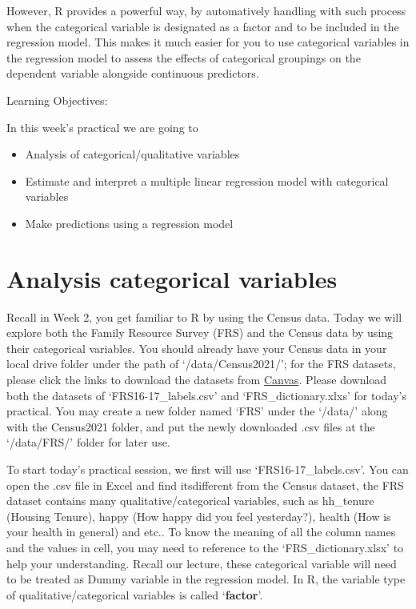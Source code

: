 \documentclass[
  letterpaper,
  DIV=11,
  numbers=noendperiod]{scrreprt}
\begin{document}
However, R provides a powerful way, by automatively handling with such
process when the categorical variable is designated as a factor and to
be included in the regression model. This makes it much easier for you
to use categorical variables in the regression model to assess the
effects of categorical groupings on the dependent variable alongside
continuous predictors.

Learning Objectives:

In this week's practical we are going to

\begin{itemize}
\item
  Analysis of categorical/qualitative variables
\item
  Estimate and interpret a multiple linear regression model with
  categorical variables
\item
  Make predictions using a regression model
\end{itemize}

\section{Analysis categorical
variables}\label{analysis-categorical-variables}

Recall in Week 2, you get familiar to R by using the Census data. Today
we will explore both the Family Resource Survey (FRS) and the Census
data by using their categorical variables. You should already have your
Census data in your local drive folder under the path of
`/data/Census2021/'; for the FRS datasets, please click the links to
download the datasets from
\href{https://canvas.liverpool.ac.uk/courses/84668/pages/family-resource-survey-2016-17?module_item_id=2396198}{Canvas}.
Please download both the datasets of `FRS16-17\_labels.csv' and
`FRS\_dictionary.xlxs' for today's practical. You may create a new
folder named `FRS' under the `/data/' along with the Census2021 folder,
and put the newly downloaded .csv files at the `/data/FRS/' folder for
later use.

To start today's practical session, we first will use
`FRS16-17\_labels.csv'. You can open the .csv file in Excel and find
itsdifferent from the Census dataset, the FRS dataset contains many
qualitative/categorical variables, such as hh\_tenure (Housing Tenure),
happy (How happy did you feel yesterday?), health (How is your health in
general) and etc.. To know the meaning of all the column names and the
values in cell, you may need to reference to the `FRS\_dictionary.xlsx'
to help your understanding. Recall our lecture, these categorical
variable will need to be treated as Dummy variable in the regression
model. In R, the variable type of qualitative/categorical variables is
called `\textbf{factor}'.
\end{document}
